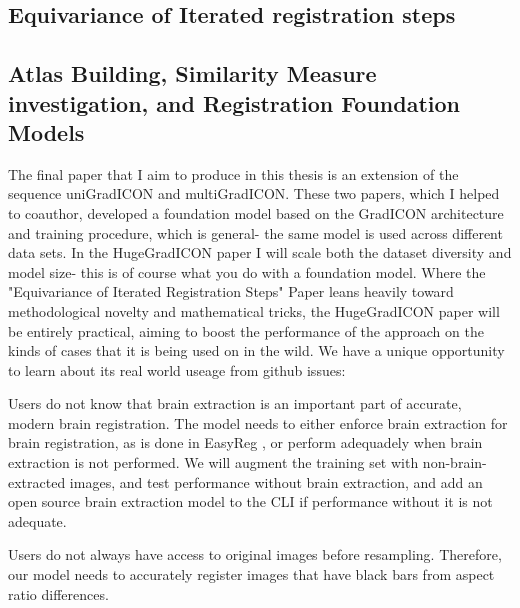 \documentclass{article}
\begin{document}
\subsection{Equivariance of Iterated registration steps}



\subsection{Atlas Building, Similarity Measure investigation, and Registration Foundation Models}

The final paper that I aim to produce in this thesis is an extension of the sequence uniGradICON and multiGradICON. These two papers, which I helped to coauthor, developed a foundation model based on the GradICON architecture and training procedure, which is general- the same model is used across different data sets. In the HugeGradICON paper I will scale both the dataset diversity and model size- this is of course what you do with a foundation model. Where the "Equivariance of Iterated Registration Steps" Paper leans heavily toward methodological novelty and mathematical tricks, the HugeGradICON paper will be entirely practical, aiming to boost the performance of the approach on the kinds of cases that it is being used on in the wild. We have a unique opportunity to learn about its real world useage from github issues:

Users do not know that brain extraction is an important part of accurate, modern brain registration. The model needs to either enforce brain extraction for brain registration, as is done in EasyReg \cite{easyReg}, or perform adequadely when brain extraction is not performed. We will augment the training set with non-brain-extracted images, and test performance without brain extraction, and add an open source brain extraction model to the CLI if performance without it is not adequate.

Users do not always have access to original images before resampling. Therefore, our model needs to accurately register images that have black bars from aspect ratio differences.





\end{document}
